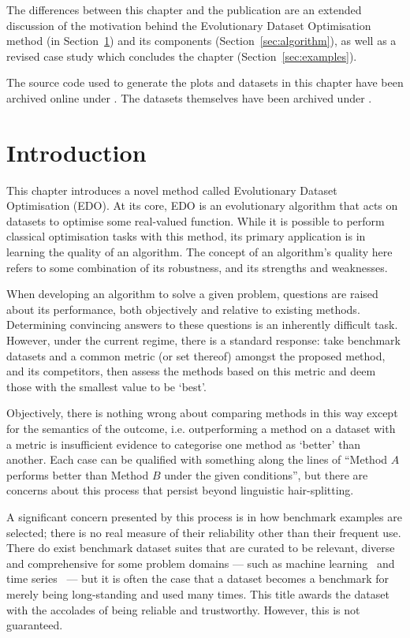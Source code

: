 \myrule%

The differences between this chapter and the publication are an extended
discussion of the motivation behind the Evolutionary Dataset Optimisation method
(in Section~\ref{sec:edo:intro}) and its components
(Section~\ref{sec:algorithm}), as well as a revised case study which concludes
the chapter (Section~\ref{sec:examples}).

The source code used to generate the plots and datasets in this chapter have
been archived online under . The datasets themselves
have been archived under .

\section{Introduction}\label{sec:edo:intro}

This chapter introduces a novel method called Evolutionary Dataset Optimisation
(EDO). At its core, EDO is an evolutionary algorithm that acts on datasets to
optimise some real-valued function. While it is possible to perform classical
optimisation tasks with this method, its primary application is in learning the
quality of an algorithm. The concept of an algorithm's quality here refers to
some combination of its robustness, and its strengths and weaknesses.

When developing an algorithm to solve a given problem, questions are raised
about its performance, both objectively and relative to existing methods.
Determining convincing answers to these questions is an inherently difficult
task. However, under the current regime, there is a standard response: take 
benchmark datasets and a common metric (or set thereof) amongst the proposed
method, and its competitors, then assess the methods based on this metric and
deem those with the smallest value to be `best'.

Objectively, there is nothing wrong about comparing methods in this way except
for the semantics of the outcome, i.e. outperforming a method on a dataset with
a metric is insufficient evidence to categorise one method as `better' than
another. Each case can be qualified with something along the lines of ``Method
\(A\) performs better than Method \(B\) under the given conditions'', but there
are concerns about this process that persist beyond linguistic hair-splitting. 

A significant concern presented by this process is in how benchmark examples are
selected; there is no real measure of their reliability other than their
frequent use. There do exist benchmark dataset suites that are curated to be
relevant, diverse and comprehensive for some problem domains --- such as machine
learning~\cite{Dua2019,Olson2017} and time series~\cite{UCRArchive2018} --- but
it is often the case that a dataset becomes a benchmark for merely being
long-standing and used many times. This title awards the dataset with the
accolades of being reliable and trustworthy. However, this is not guaranteed.

